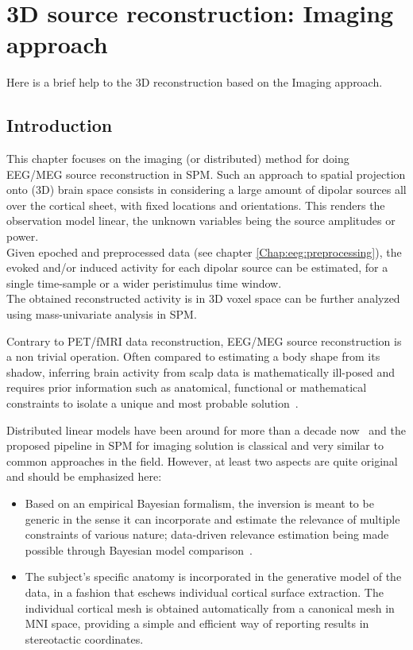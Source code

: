 \chapter{3D source reconstruction: Imaging approach \label{Chap:eeg:imaging}}

Here is a brief help to the 3D reconstruction based on the Imaging approach.

\section{Introduction}
\label{sec:imaginv_intro}
This chapter focuses on the imaging (or distributed) method for doing 
EEG/MEG source reconstruction in SPM.
Such an approach to spatial projection onto (3D) brain space consists
in considering a large amount of dipolar sources all over the cortical sheet, 
with fixed locations and orientations. This renders the observation model linear, 
the unknown variables being the source amplitudes or power.\\
Given epoched and preprocessed data (see chapter \ref{Chap:eeg:preprocessing}), the evoked and/or induced
activity for each dipolar source can be estimated, for a single time-sample or a 
wider peristimulus time window.\\
The obtained reconstructed activity is in 3D voxel space can be further analyzed using mass-univariate
analysis in SPM.

Contrary to PET/fMRI data reconstruction, EEG/MEG source reconstruction 
is a non trivial operation. Often compared to estimating a body shape from 
its shadow, inferring brain activity from scalp data is mathematically ill-posed 
and requires prior information such as anatomical, functional or mathematical
constraints to isolate a unique and most probable solution~\cite{Baillet01}.

Distributed linear models have been around for more than a decade now~\cite{Dale93}
and the proposed pipeline in SPM for imaging solution is classical and very similar
to common approaches in the field. However, at least two aspects are quite original 
and should be emphasized here:

\begin{itemize}
\item Based on an empirical Bayesian formalism, the inversion is meant 
to be generic in the sense it can incorporate and estimate the relevance
of multiple constraints of various nature; data-driven relevance estimation 
being made possible through Bayesian model 
comparison~\cite{peb1,cp_empirical_eeg,jm_multiple,karl_induced}.
\item The subject's specific anatomy is incorporated in the generative model
of the data, in a fashion that eschews individual cortical surface extraction.
The individual cortical mesh is obtained automatically from a canonical mesh in 
MNI space, providing a simple and efficient way of reporting results in stereotactic coordinates.
\end{itemize}


